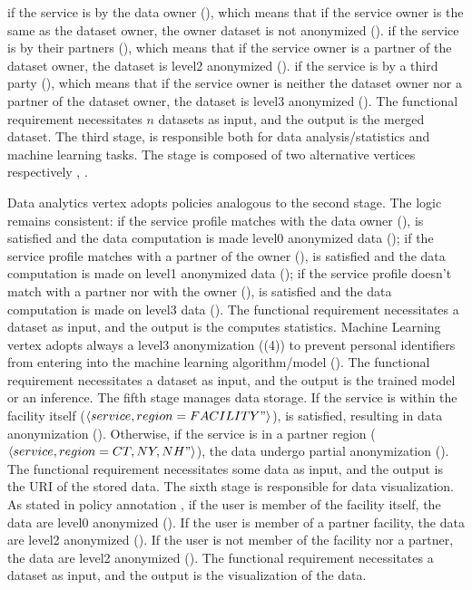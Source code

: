 if the service is by the data owner (\pone), which means that if the service owner is the same as the dataset owner, the owner dataset is not anonymized ().
if the service is by their partners (\ptwo), which means that if the service owner is a partner of the dataset owner, the dataset is level2 anonymized ().
if the service is by a third party  (\pthree), which means that if the service owner is neither the dataset owner nor a partner of the dataset owner, the dataset is level3 anonymized ().
The functional requirement necessitates $n$ datasets as input, and the output is the merged dataset.
The third stage, is responsible both for data analysis/statistics and machine learning tasks.
The stage is composed of two alternative vertices respectively , .

Data analytics vertex adopts policies analogous to the second stage. The logic remains consistent:
if the service profile matches with the data owner (\pone),  is satisfied and the data computation is made level0 anonymized data ();
if the service profile matches with a partner of the owner (\ptwo),  is satisfied and the data computation is made on level1 anonymized data ();
if the service profile doesn't match with a partner nor with the owner (\pthree),  is satisfied and the data computation is made on level3 data ().
The functional requirement necessitates a dataset as input, and the output is the computes statistics.
Machine Learning vertex adopts always a level3 anonymization (\p(4)) to prevent personal identifiers from entering into the machine learning algorithm/model ().
The functional requirement necessitates a dataset as input, and the output is the trained model or an inference.
The fifth stage manages data storage.
If the service is within the facility itself ($\langle service,region=FACILITY"\rangle$),  is satisfied, resulting in data anonymization ().
Otherwise, if the service is in a partner region ($\langle service,region={CT,NY,NH}"\rangle$), the data undergo partial anonymization ().
The functional requirement necessitates some data as input, and the output is the URI of the stored data.
The sixth stage is responsible for data visualization.
As stated in policy annotation , if the user is member of the facility itself, the data are level0 anonymized ().
If the user is member of a partner facility, the data are  level2 anonymized ().
If the user is not member of the facility nor a partner, the data are level2 anonymized ().
The functional requirement necessitates a dataset as input, and the output is the visualization of the data.


